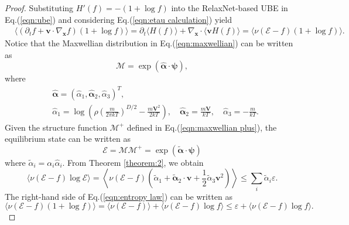 \documentclass[preprint,3p,12pt,sort&compress]{elsarticle}
\begin{document}
\begin{proof}
Substituting $H'(f)=-(1+\log f)$ into the RelaxNet-based UBE in Eq.(\ref{eqn:ube}) and considering Eq.(\ref{eqn:etau calculation}) yield
\begin{equation}
\begin{aligned}
    &\langle (\partial_t f + \mathbf v \cdot \nabla_\mathbf x f)(1+\log f) \rangle = \partial_t \langle H(f) \rangle + \nabla_\mathbf x \cdot \langle \mathbf v H(f) \rangle = \langle \nu (\mathcal E - f)(1+\log f) \rangle.
\end{aligned}
\label{eqn:entropy law}
\end{equation}
Notice that the Maxwellian distribution in Eq.(\ref{eqn:maxwellian}) can be written as
\begin{equation}
    \mathcal M = \exp(\hat{\boldsymbol\alpha} \cdot \boldsymbol\psi),
\end{equation}
where 
\begin{equation}
\begin{aligned}
    &\hat{\boldsymbol\alpha}=(\hat\alpha_1,\hat{\boldsymbol\alpha}_2,\hat\alpha_3)^T, \\
    &\hat\alpha_1=\log \left( \rho \left(\frac{m}{2\pi k T}\right)^{D/2} - \frac{m \mathbf V^2}{2kT} \right), \quad
    \hat{\boldsymbol\alpha}_2=\frac{m\mathbf V}{kT},\quad \hat\alpha_3=-\frac{m}{kT}.
\end{aligned}
\label{eqn:maxwellian alpha}
\end{equation}
Given the structure function $\mathcal M^+$ defined in Eq.(\ref{eqn:maxwellian plus}), the equilibrium state can be written as
\begin{equation}
    \mathcal E = \mathcal M \mathcal M^+ = \exp(\tilde{\boldsymbol\alpha} \cdot \boldsymbol\psi)
\end{equation}
where $\tilde\alpha_i=\alpha_i \hat\alpha_i$.
From Theorem \ref{theorem:2}, we obtain
\begin{equation}
    \langle \nu (\mathcal E - f)\log \mathcal E \rangle = \left\langle \nu (\mathcal E - f) \left(\tilde\alpha_1 + \tilde{\boldsymbol\alpha}_2 \cdot \mathbf v + \frac{1}{2} \tilde\alpha_3 \mathbf v^2 \right) \right\rangle \leq \sum_i \tilde\alpha_i \varepsilon.
    \label{eqn:entropy dissipation}
\end{equation}
The right-hand side of Eq.(\ref{eqn:entropy law}) can be written as
\begin{equation}
    \langle \nu (\mathcal E - f)(1+\log f) \rangle = \langle \nu (\mathcal E - f) \rangle + \langle \nu (\mathcal E - f)\log f \rangle \leq \varepsilon + \langle \nu (\mathcal E - f)\log f \rangle.

\end{equation}
\end{proof}
\end{document}
